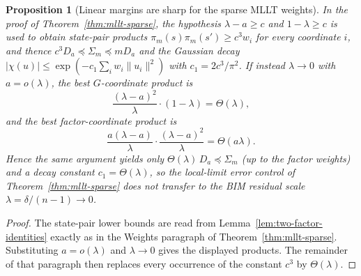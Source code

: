 \documentclass[11pt]{article}
\newtheorem{proposition}[theorem]{Proposition}
\begin{document}
\begin{proposition}[Linear margins are sharp for the sparse MLLT weights]
\label{prop:mllt-vanishing-margin}
In the proof of Theorem~\ref{thm:mllt-sparse}, the hypothesis
\(\lambda-a\ge c\) and \(1-\lambda\ge c\) is used to obtain state-pair products
\(\pi_m(s)\pi_m(s')\ge c^3w_i\) for every coordinate \(i\), and thence
\(c^3D_a\preceq\Sigma_m\preceq mD_a\) and the Gaussian decay
\(|\chi(u)|\le\exp(-c_1\sum_iw_i\|u_i\|^2)\) with \(c_1=2c^3/\pi^2\).
If instead \(\lambda\to0\) with \(a=o(\lambda)\), the best \(G\)-coordinate product
is
\[
\frac{(\lambda-a)^2}{\lambda}\cdot(1-\lambda)=\Theta(\lambda),
\]
and the best factor-coordinate product is
\[
\frac{a(\lambda-a)}{\lambda}\cdot\frac{(\lambda-a)^2}{\lambda}=\Theta(a\lambda).
\]
Hence the same argument yields only
\(\Theta(\lambda)\,D_a\preceq\Sigma_m\) (up to the factor weights) and a decay
constant \(c_1=\Theta(\lambda)\), so the local-limit error control of
Theorem~\ref{thm:mllt-sparse} does not transfer to the BIM residual scale
\(\lambda=\delta/(n-1)\to0\).
\end{proposition}

\begin{proof}
The state-pair lower bounds are read from Lemma~\ref{lem:two-factor-identities}
exactly as in the Weights paragraph of Theorem~\ref{thm:mllt-sparse}. Substituting
\(a=o(\lambda)\) and \(\lambda\to0\) gives the displayed products. The remainder of
that paragraph then replaces every occurrence of the constant \(c^3\) by
\(\Theta(\lambda)\).
\end{proof}
\end{document}
